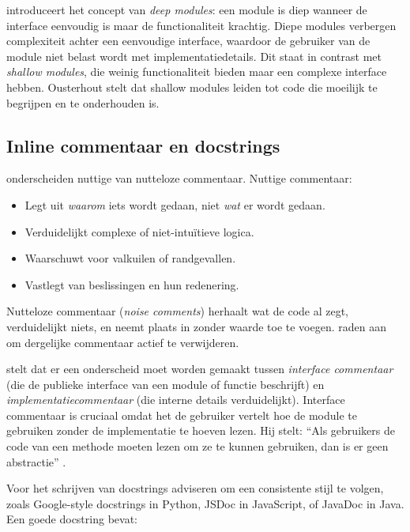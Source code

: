 \textcite{ousterhout2018philosophy} introduceert het concept van \textit{deep modules}: een module is diep wanneer de interface eenvoudig is maar de functionaliteit krachtig. Diepe modules verbergen complexiteit achter een eenvoudige interface, waardoor de gebruiker van de module niet belast wordt met implementatiedetails. Dit staat in contrast met \textit{shallow modules}, die weinig functionaliteit bieden maar een complexe interface hebben. Ousterhout stelt dat shallow modules leiden tot code die moeilijk te begrijpen en te onderhouden is.

\subsection{Inline commentaar en docstrings}
\textcite{boswell2011readablecode} onderscheiden nuttige van nutteloze commentaar. Nuttige commentaar:

\begin{itemize}
    \item Legt uit \textit{waarom} iets wordt gedaan, niet \textit{wat} er wordt gedaan.
    \item Verduidelijkt complexe of niet-intuïtieve logica.
    \item Waarschuwt voor valkuilen of randgevallen.
    \item Vastlegt van beslissingen en hun redenering.
\end{itemize}

Nutteloze commentaar (\textit{noise comments}) herhaalt wat de code al zegt, verduidelijkt niets, en neemt plaats in zonder waarde toe te voegen. \textcite{boswell2011readablecode} raden aan om dergelijke commentaar actief te verwijderen.

\textcite{ousterhout2018philosophy} stelt dat er een onderscheid moet worden gemaakt tussen \textit{interface commentaar} (die de publieke interface van een module of functie beschrijft) en \textit{implementatiecommentaar} (die interne details verduidelijkt). Interface commentaar is cruciaal omdat het de gebruiker vertelt hoe de module te gebruiken zonder de implementatie te hoeven lezen. Hij stelt: ``Als gebruikers de code van een methode moeten lezen om ze te kunnen gebruiken, dan is er geen abstractie'' \autocite{ousterhout2018philosophy}.

Voor het schrijven van docstrings adviseren \textcite{bhatti2021docsdevelopers} om een consistente stijl te volgen, zoals Google-style docstrings in Python, JSDoc in JavaScript, of JavaDoc in Java. Een goede docstring bevat:

